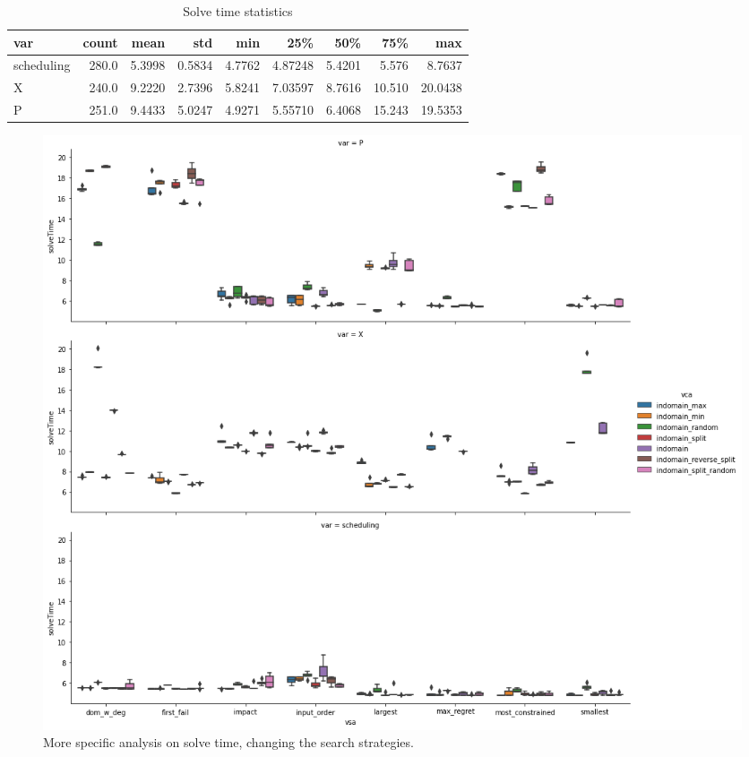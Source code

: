 \documentclass[10pt]{article}
\begin{document}
	\begin{table}
		\scriptsize
		\centering
		\begin{tabular}{lrrrrrrrr}
		\toprule
		var &  count &      mean &       std &      min &       25\% &       50\% &     75\% &       max \\
		\midrule
		scheduling &  280.0 &  5.3998 &  0.5834 &  4.7762 &  4.87248 &  5.4201 &   5.576 &   8.7637 \\
		X          &  240.0 &  9.2220 &  2.7396 &  5.8241 &  7.03597 &  8.7616 &  10.510 &  20.0438 \\
		P          &  251.0 &  9.4433 &  5.0247 &  4.9271 &  5.55710 &  6.4068 &  15.243 &  19.5353 \\
		\bottomrule
		\end{tabular}

		\caption{Solve time statistics}
		\label{tab:more-specific}
	\end{table}

	\begin{figure}
		\centering
		\includegraphics[width=\textwidth]{solve-time-specific.png}
		\caption{More specific analysis on solve time, changing the search strategies.}
		\label{fig:solve-time-specific}
	\end{figure}


	
\end{document}
